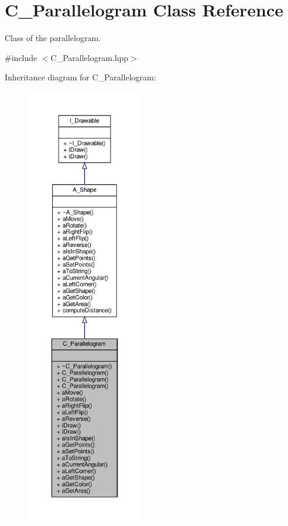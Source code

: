 \hypertarget{classC__Parallelogram}{}\section{C\+\_\+\+Parallelogram Class Reference}
\label{classC__Parallelogram}


Class of the parallelogram.  




{\ttfamily \#include $<$C\+\_\+\+Parallelogram.\+hpp$>$}



Inheritance diagram for C\+\_\+\+Parallelogram\+:
\nopagebreak
\begin{figure}[H]
\begin{center}
\leavevmode
\includegraphics[height=550pt]{classC__Parallelogram__inherit__graph}
\end{center}
\end{figure}



